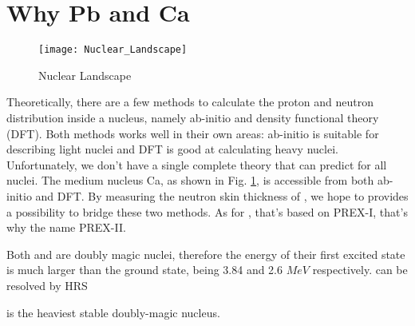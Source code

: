 \section{Why Pb and Ca}
\begin{figure}
    \centering
    \texttt{[image: Nuclear\_Landscape]}
    \caption{Nuclear Landscape}
    \label{fig:nuclear_landscape}
\end{figure}
Theoretically, there are a few methods to calculate the proton and neutron distribution
inside a nucleus, namely ab-initio and density functional theory (DFT). Both
methods works well in their own areas: ab-initio is suitable for describing  
light nuclei and DFT is good at calculating heavy nuclei. Unfortunately, we 
don't have a single complete theory that can predict for all nuclei. The medium
nucleus Ca, as shown in Fig. \ref{fig:nuclear_landscape}, is accessible from both
ab-initio and DFT. By measuring the neutron skin thickness of \Ca, we hope to 
provides a possibility to bridge these two methods. As for \Pb, that's based on
PREX-I, that's why the name PREX-II.

Both \Ca and \Pb are doubly magic nuclei, therefore the energy of their first 
excited state is much larger than the ground state, being 3.84 and 2.6 $MeV$ 
respectively.
can be resolved by HRS

\Pb is the heaviest stable doubly-magic nucleus.
